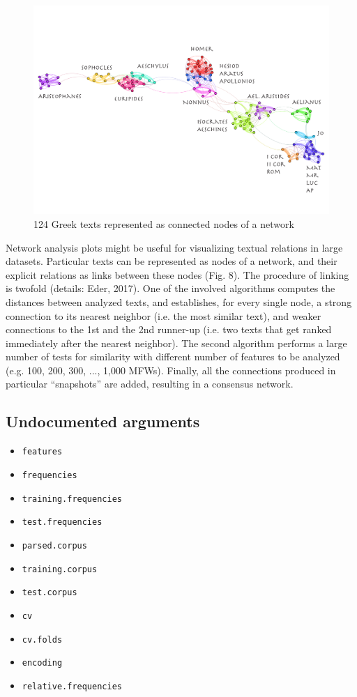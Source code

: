 \documentclass[11pt,a4paper]{article}
\def\code#1{{\tt #1}}
\begin{document}
\begin{figure}
  \centering
  \includegraphics[width=0.8\linewidth]{img/124_Greek_texts.png}
  \caption{124 Greek texts represented as connected nodes of a network}
\end{figure}

Network analysis plots might be useful for visualizing textual relations 
in large datasets. Particular texts can be represented as nodes of a network, 
and their explicit relations as links between these nodes (Fig. 8). 
The procedure of linking is twofold (details: Eder, 2017). 
One of the involved algorithms computes the distances between analyzed texts, 
and establishes, for every single node, a strong connection to its nearest 
neighbor (i.e. the most similar text), and weaker connections to the 1st and 
the 2nd runner-up (i.e. two texts that get ranked immediately after the 
nearest neighbor). The second algorithm performs a large number of tests 
for similarity with different number of features to be analyzed 
(e.g. 100, 200, 300, ..., 1,000 MFWs). Finally, all the connections produced 
in particular “snapshots” are added, resulting in a consensus network. 





\subsection{Undocumented arguments}

\begin{itemize}

\item \code{features}
\item \code{frequencies}
\item \code{training.frequencies}
\item \code{test.frequencies}
\item \code{parsed.corpus}
\item \code{training.corpus}
\item \code{test.corpus}
\item \code{cv}
\item \code{cv.folds}
\item \code{encoding}
\item \code{relative.frequencies}

\end{itemize}
\end{document}
